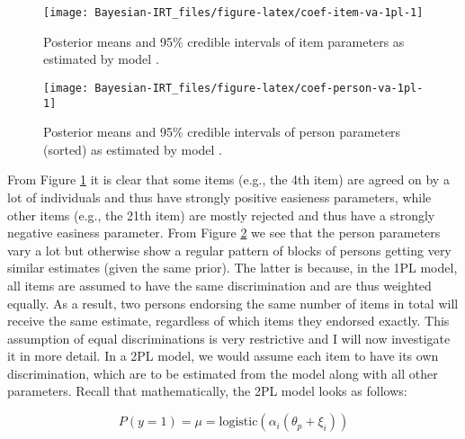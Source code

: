 \documentclass[
]{jss}
\begin{document}
\begin{CodeChunk}
\begin{figure}

{\centering \texttt{[image: Bayesian-IRT\_files/figure-latex/coef-item-va-1pl-1]} 

}

\caption[Posterior means and 95\% credible intervals of item parameters as estimated by model ]{Posterior means and 95\% credible intervals of item parameters as estimated by model .}\label{fig:coef-item-va-1pl}
\end{figure}
\end{CodeChunk}

\begin{CodeChunk}
\begin{figure}

{\centering \texttt{[image: Bayesian-IRT\_files/figure-latex/coef-person-va-1pl-1]} 

}

\caption[Posterior means and 95\% credible intervals of person parameters (sorted) as estimated by model ]{Posterior means and 95\% credible intervals of person parameters (sorted) as estimated by model .}\label{fig:coef-person-va-1pl}
\end{figure}
\end{CodeChunk}

From Figure \ref{fig:coef-item-va-1pl} it is clear that some items
(e.g., the 4th item) are agreed on by a lot of individuals and thus have
strongly positive easieness parameters, while other items (e.g., the
21th item) are mostly rejected and thus have a strongly negative
easiness parameter. From Figure \ref{fig:coef-person-va-1pl} we see that
the person parameters vary a lot but otherwise show a regular pattern of
blocks of persons getting very similar estimates (given the same prior).
The latter is because, in the 1PL model, all items are assumed to have
the same discrimination and are thus weighted equally. As a result, two
persons endorsing the same number of items in total will receive the
same estimate, regardless of which items they endorsed exactly. This
assumption of equal discriminations is very restrictive and I will now
investigate it in more detail. In a 2PL model, we would assume each item
to have its own discrimination, which are to be estimated from the model
along with all other parameters. Recall that mathematically, the 2PL
model looks as follows:

\[
P(y = 1) = \mu = \text{logistic}(\alpha_i (\theta_p + \xi_i))
\]
\end{document}
